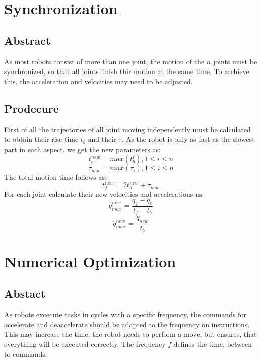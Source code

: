 \documentclass{article}
\begin{document}
	\section{Synchronization}
	\subsection{Abstract}
	As most robots consist of more than one joint, the motion of the $n$ joints must be synchronized, so that all joints finish thir motion at the same time. To archieve this, the acceleration and velocities may need to be adjusted. 
	\subsection{Prodecure}
	First of all the trajectories of all joint moving independently must be calculated to obtain their rise time $t_b$ and their $\tau$. As the robot is only as fast as the slowest part in each aspect, we get the new parameters as:
	\begin{equation}
	t_{b}^{new} = max(t_{b}^{i}), 1\leq i \leq n
	\end{equation}
	\begin{equation}
	\tau_{new} = max({\tau_i}), 1\leq i \leq n
	\end{equation}
	The total motion time follows as:
	\begin{equation}
	t_{f}^{new} = 2t_{b}^{new}+\tau_{new}
	\end{equation}
	For each joint calculate their new velocities and accelerations as:
	\begin{equation}
	\dot{q}_{max}^{new} = \frac{q_f-q_0}{t_f-t_b}
	\end{equation}
	\begin{equation}
	\ddot{q}_{max}^{new} = \frac{\dot{q}_{new}}{t_b}
	\end{equation}
	\section{Numerical Optimization}
	\subsection{Abstact}
	As robots excecute tasks in cycles with a specific frequency, the commands for accelerate and deaccelerate should be adapted to the frequency on instructions. This may increase the time, the robot needs to perform a move, but ensures, that everything will be executed correctly. The frequency $f$ defines the time, between to commands.
	\newpage
\end{document}
